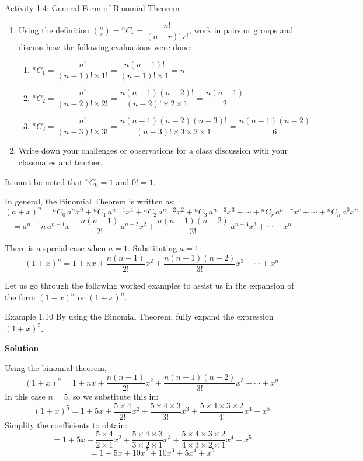 \begin{activity}{Activity 1.4: General Form of Binomial Theorem}
\begin{enumerate}
  \item Using the definition $\binom{n}{r} = {}^{n}C_{r} = \dfrac{n!}{(n-r)!\,r!}$, work in pairs or
  groups and discuss how the following evaluations were done:
  \begin{enumerate}
    \item[a.] ${}^{n}C_{1} = \dfrac{n!}{(n-1)!\times 1!} = \dfrac{n(n-1)!}{(n-1)!\times 1} = n$
    \item[b.] ${}^{n}C_{2} = \dfrac{n!}{(n-2)!\times 2!} = \dfrac{n(n-1)(n-2)!}{(n-2)!\times 2\times 1} = \dfrac{n(n-1)}{2}$
    \item[c.] ${}^{n}C_{3} = \dfrac{n!}{(n-3)!\times 3!} = \dfrac{n(n-1)(n-2)(n-3)!}{(n-3)!\times 3\times 2\times 1} = \dfrac{n(n-1)(n-2)}{6}$
  \end{enumerate}
  \item Write down your challenges or observations for a class discussion with
  your classmates and teacher.
\end{enumerate}
\end{activity}

It must be noted that ${}^{n}C_{0} = 1$ and $0! = 1$.

In general, the Binomial Theorem is written as:
\[
  (a+x)^n = {}^{n}C_{0}\,a^n x^0 + {}^{n}C_{1}\,a^{n-1}x^1 + {}^{n}C_{2}\,a^{n-2}x^2 + {}^{n}C_{3}\,a^{n-3}x^3 + \cdots + {}^{n}C_{r}\,a^{n-r}x^r + \cdots + {}^{n}C_{n}\,a^0 x^n
\]
\[
  = a^n + n\,a^{n-1}x + \frac{n(n-1)}{2!}\,a^{n-2}x^2 + \frac{n(n-1)(n-2)}{3!}\,a^{n-3}x^3 + \cdots + x^n
\]

There is a special case when $a = 1$. Substituting $a=1$:
\[
  (1+x)^n = 1 + nx + \frac{n(n-1)}{2!}x^2 + \frac{n(n-1)(n-2)}{3!}x^3 + \cdots + x^n
\]

Let us go through the following worked examples to assist us in the expansion
of the form $(1-x)^n$ or $(1+x)^n$.

\begin{example}{Example 1.10}
By using the Binomial Theorem, fully expand the expression $(1+x)^5$.

\medskip\noindent\textbf{Solution}

Using the binomial theorem,
\[
  (1+x)^n = 1 + nx + \frac{n(n-1)}{2!}x^2 + \frac{n(n-1)(n-2)}{3!}x^3 + \cdots + x^n
\]
In this case $n=5$, so we substitute this in:
\[
  (1+x)^5 = 1 + 5x + \frac{5\times4}{2!}x^2 + \frac{5\times4\times3}{3!}x^3 + \frac{5\times4\times3\times2}{4!}x^4 + x^5
\]
Simplify the coefficients to obtain:
\[
  = 1 + 5x + \frac{5\times4}{2\times1}x^2 + \frac{5\times4\times3}{3\times2\times1}x^3 + \frac{5\times4\times3\times2}{4\times3\times2\times1}x^4 + x^5
\]
\[
  = 1 + 5x + 10x^2 + 10x^3 + 5x^4 + x^5
\]
\end{example}


